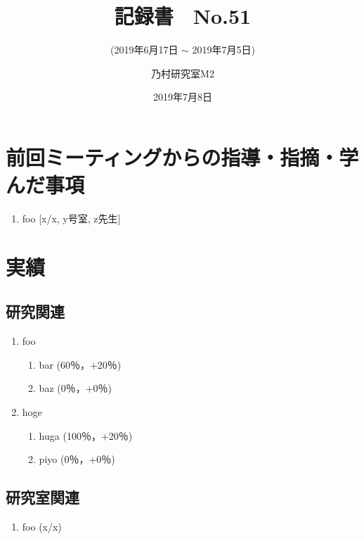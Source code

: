 \documentclass[fleqn, 12pt]{extarticle}
\subtitle{(2019年6月17日 $\sim$ 2019年7月5日)}
\author{乃村研究室M2\\\ruby{山本}{やまもと} \ruby{瑛治}{えいじ}}
\date{2019年7月8日}
\title{記録書　No.51}
\begin{document}
\begin{spacing}{1.2}

  \maketitle
  \section{前回ミーティングからの指導・指摘・学んだ事項}
  \label{sec1}
  \begin{enumerate}
  \item foo
    \hfill
        [x/x, y号室, z先生]
  \end{enumerate}

  \section{実績}
  \label{sec2}
  \subsection{研究関連}
  \label{sec2-1}
  \begin{enumerate}
  \item foo
    \begin{enumerate}
    \item bar
      \hfill
      \label{sec2-1-1-enum1}
      (60％，+20％)

    \item baz
      \hfill
      \label{sec2-1-1-enum2}
      (0％，+0％)

    \end{enumerate}
  \item hoge
    \begin{enumerate}
    \item huga
      \hfill
      \label{sec2-1-2-enum1}
      (100％，+20％)
    \item piyo
      \hfill
      \label{sec2-1-2-enum2}
      (0％，+0％)
    \end{enumerate}
  \end{enumerate}

  \subsection{研究室関連}
  \label{sec2-2}
  \begin{enumerate}
  \item foo
    \hfill
    \label{sec2-2-enum1}
    (x/x)
  \end{enumerate}


\end{spacing}
\end{document}
